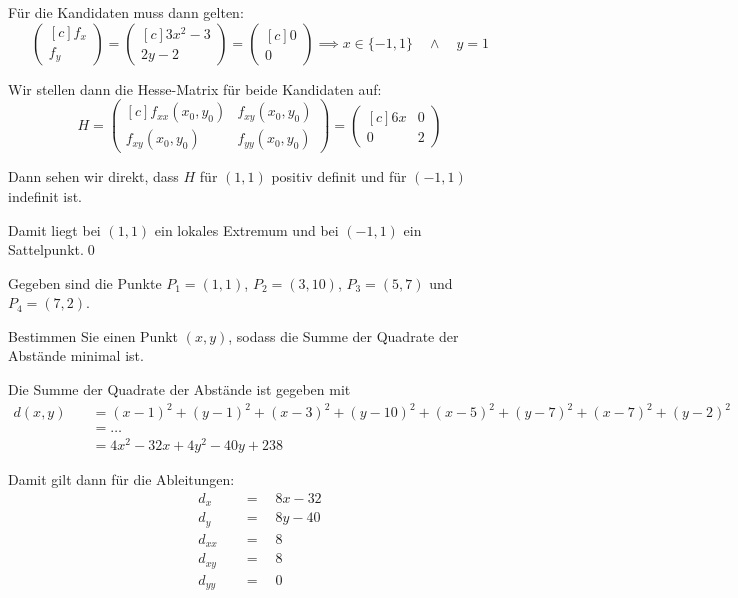 \documentclass[answers]{exam}
\newcommand{\vektor}[1]{\begin{pmatrix*}[c] #1 \end{pmatrix*}}
\begin{document}
\begin{questions}
\begin{solution}
        Für die Kandidaten muss dann gelten:
        $$
            \vektor{f_x \\ f_y} = \vektor{3x^2-3 \\ 2y-2} = \vektor{0\\0} \implies x\in \{-1, 1\} \quad \land \quad y = 1
        $$

        Wir stellen dann die Hesse-Matrix für beide Kandidaten auf:
        $$
            H = \vektor{f_{xx}(x_0, y_0) & f_{xy}(x_0, y_0) \\ f_{xy}(x_0, y_0) & f_{yy}(x_0, y_0)} = \vektor{6x & 0 \\ 0 & 2}
        $$

        Dann sehen wir direkt, dass $H$ für $(1, 1)$ positiv definit und für $(-1, 1)$ indefinit ist.

        Damit liegt bei $(1, 1)$ ein lokales Extremum und bei $(-1, 1)$ ein Sattelpunkt.\qed
    \end{solution}

    \newpage
    \question
    Gegeben sind die Punkte $P_1 = (1, 1)$, $P_2 = (3, 10)$, $P_3 = (5, 7)$ und $P_4 = (7, 2)$.

    Bestimmen Sie einen Punkt $(x, y)$, sodass die Summe der Quadrate der Abstände minimal ist.
    \begin{solution}
        Die Summe der Quadrate der Abstände ist gegeben mit
        $$
            \begin{aligned}
                d(x, y) & \quad = (x-1)^2 + (y-1)^2 + (x-3)^2 + (y-10)^2 + (x-5)^2 + (y-7)^2 + (x-7)^2 + (y-2)^2 \\
                        & \quad = \ldots                                                                         \\
                        & \quad = 4x^2 - 32x + 4y^2 -40y + 238
            \end{aligned}
        $$

        Damit gilt dann für die Ableitungen:
        $$
            \begin{aligned}
                d_x \quad    & = \quad 8x - 32 \\
                d_y \quad    & = \quad 8y - 40 \\
                d_{xx} \quad & = \quad 8       \\
                d_{xy} \quad & = \quad 8       \\
                d_{yy} \quad & = \quad 0
            \end{aligned}
        $$


\end{solution}
\end{questions}
\end{document}
